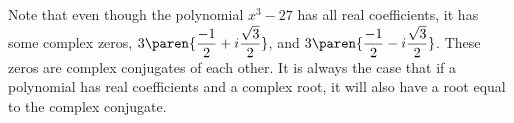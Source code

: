 Note that even though the polynomial $x^{3}-27$ has all real coefficients,
it has some complex zeros, $3\paren{\displaystyle
\frac{-1}{2}+i\displaystyle\frac{\sqrt{3}}{2}}$, and $3\paren{
\displaystyle\frac{-1}{2}-i\displaystyle\frac{\sqrt{3}}{2}}$.
These zeros are complex conjugates of each other. It is always the case that if a polynomial has real
coefficients and a complex root, it will also
have a root equal to the complex conjugate.
